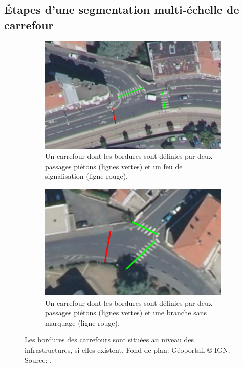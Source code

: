 \subsection{Étapes d'une segmentation multi-échelle de carrefour}

\begin{figure}[ht]
    \centering
    \begin{subfigure}[t]{.49\linewidth}
        \includegraphics[width=\textwidth]{images/modelisation/segmentation/orthophoto-1.pdf}
        \caption{Un carrefour dont les bordures sont définies par deux passages piétons (lignes vertes) et un feu de signalisation (ligne rouge).\label{fig:modelisation_limite_carrefourA}}
    \end{subfigure}
    \begin{subfigure}[t]{.49\linewidth}
        \includegraphics[width=\textwidth]{images/modelisation/segmentation/orthophoto-2.pdf}
        \caption{Un carrefour dont les bordures sont définies par deux passages piétons (lignes vertes) et une branche sans marquage (ligne rouge). \label{fig:modelisation_limite_carrefourB}}
    \end{subfigure}
    \caption[Définition des bordures d'un carrefour]{Les bordures des carrefours sont situées au niveau des infrastructures, si elles existent. Fond de plan: Géoportail © IGN. Source: \citep{Favreau2022}.}
    \label{fig:modelisation_limite_carrefour}
\end{figure}

